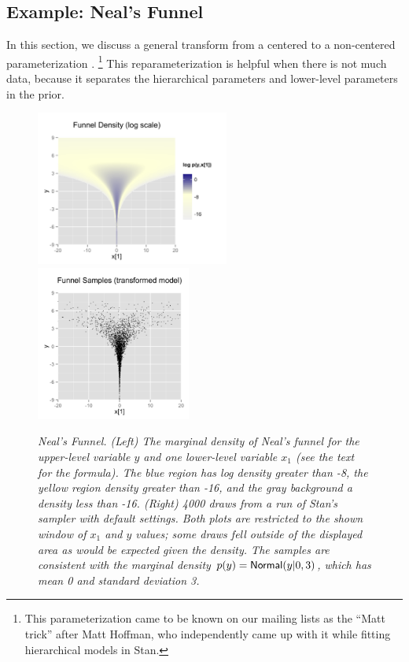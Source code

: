 \subsection{Example: Neal's Funnel}

In this section, we discuss a general transform from a centered to a
non-centered parameterization \cite{papa-et-al:2007}.%
%
\footnote{This parameterization came to be known on our mailing lists
  as the ``Matt trick'' after Matt Hoffman, who independently came up
  with it while fitting hierarchical models in Stan.}
%
This reparameterization is helpful when there is not much data,
because it separates the hierarchical parameters and lower-level
parameters in the prior.
%
\begin{figure}[t]
\vspace*{-6pt}
\begin{center}
\includegraphics[height=2in]{img/funnel.png}
\includegraphics[height=2in]{img/funnel-fit.png}
\end{center}
\vspace*{-18pt}
\caption{\small\it Neal's Funnel.  (Left) The marginal density of
  Neal's funnel for the upper-level variable $y$ and one lower-level
  variable $x_1$ (see the text for the formula).  The blue region has
  log density greater than -8, the yellow region density greater than
  -16, and the gray background a density less than -16.
  (Right) 4000 draws from a run of Stan's
  sampler with default settings.  Both plots are restricted to the
  shown window of $x_1$ and $y$ values; some draws fell outside of
  the displayed area as would be expected given the density.  The samples are
  consistent with the marginal density $p(y) =
  \mbox{\sf Normal}(y|0,3)$, which has mean 0 and standard deviation
  3.}\label{funnel.figure}
\end{figure}

